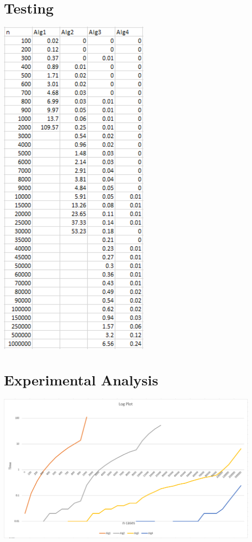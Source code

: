 \documentclass[11pt,letterpaper]{article}
\begin{document}
\section{Testing}
\centerline{\includegraphics[width=3in]{TestTimes.png}}

\pagebreak
\section{Experimental Analysis}
\centerline{\includegraphics[width=7in]{LogPlot.png}}
\end{document}
